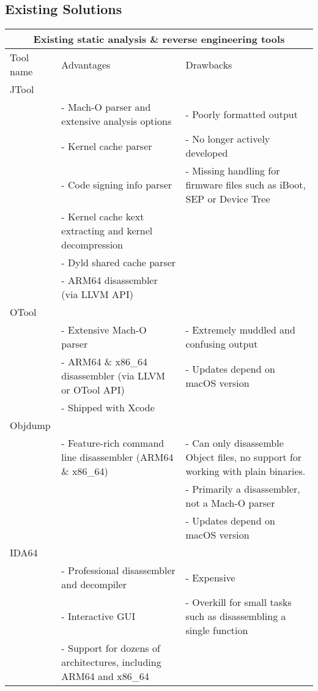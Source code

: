 \subsection{Existing Solutions}


\begin{center}
\begin{tabular}{ |p{5.25cm}|p{5.25cm}|p{5.25cm}|  }
\hline
\multicolumn{3}{|c|}{Existing static analysis \& reverse engineering tools} \\
\hline
Tool name & Advantages & Drawbacks \\
\hline

JTool & & \\
& - Mach-O parser and extensive analysis options & - Poorly formatted output \\
& - Kernel cache parser & - No longer actively developed \\
& - Code signing info parser & - Missing handling for firmware files such as iBoot, SEP or Device Tree \\
& - Kernel cache kext extracting and kernel decompression & \\
& - Dyld shared cache parser & \\
& - ARM64 disassembler (via LLVM API) & \\

\hline

OTool & & \\
& - Extensive Mach-O parser & - Extremely muddled and confusing output \\
& - ARM64 \& x86\_64 disassembler (via LLVM or OTool API) & - Updates depend on macOS version \\
& - Shipped with Xcode & \\

\hline


Objdump & & \\
& - Feature-rich command line disassembler (ARM64 \& x86\_64) & - Can only disassemble Object files, no support for working with plain binaries. \\
& & - Primarily a disassembler, not a Mach-O parser \\
& & - Updates depend on macOS version \\

\hline


IDA64 & & \\
& - Professional disassembler and decompiler & - Expensive \\
& - Interactive GUI & - Overkill for small tasks such as disassembling a single function \\
& - Support for dozens of architectures, including ARM64 and x86\_64 & \\

\hline
\end{tabular}
\end{center}
